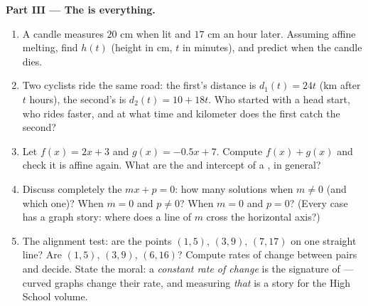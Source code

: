 \begin{problem}
\medskip
\noindent\textbf{Part III --- The  is everything.}
\begin{enumerate}[resume]
  \item A candle measures $20$ cm when lit and $17$ cm  an
        hour later. Assuming affine melting, find $h(t)$ (height
        in cm, $t$ in minutes), and predict when the candle dies.
  \item Two cyclists ride the same road: the first's distance is
        $d_1(t) = 24t$ (km after $t$ hours), the second's is
        $d_2(t) = 10 + 18t$. Who started with a head start, who
        rides faster, and at what time and kilometer does the
        first catch the second?
  \item Let $f(x) = 2x + 3$ and $g(x) = -0.5x + 7$. Compute
        $f(x) + g(x)$ and check it is affine again. What are the
         and intercept of a , in general?
  \item Discuss completely the  $mx + p = 0$: how many
        solutions when $m \neq 0$ (and which one)? When $m = 0$
        and $p \neq 0$? When $m = 0$ and $p = 0$? (Every case
        has a graph story: where does a line of  $m$ cross
        the horizontal axis?)
  \item The alignment test: are the points $(1, 5)$, $(3, 9)$,
        $(7, 17)$ on one straight line? Are $(1, 5)$, $(3, 9)$,
        $(6, 16)$? Compute rates of change between pairs and
        decide. State the moral: a \emph{constant rate of
        change} is the signature of  --- curved
        graphs change their rate, and measuring \emph{that} is a
        story for the High School volume.
\end{enumerate}
\end{problem}
